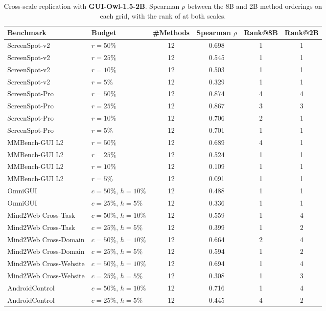 \begin{table}[t]
    \centering
    \caption{Cross-scale replication with \textbf{GUI-Owl-1.5-2B}. Spearman $\rho$ between the 8B and 2B method orderings on each grid, with the rank of \method{} at both scales.}
    \label{tab:scale-rep}
    \small
    \begin{tabular}{ll ccc c}
        \toprule
        \textbf{Benchmark} & \textbf{Budget} & \textbf{\#Methods} & \textbf{Spearman $\rho$} & \textbf{Rank@8B} & \textbf{Rank@2B} \\
        \midrule
        ScreenSpot-v2 & $r{=}50\%$ & 12 & 0.698 & 1 & 1 \\
        ScreenSpot-v2 & $r{=}25\%$ & 12 & 0.545 & 1 & 1 \\
        ScreenSpot-v2 & $r{=}10\%$ & 12 & 0.503 & 1 & 1 \\
        ScreenSpot-v2 & $r{=}5\%$ & 12 & 0.329 & 1 & 1 \\
        ScreenSpot-Pro & $r{=}50\%$ & 12 & 0.874 & 4 & 4 \\
        ScreenSpot-Pro & $r{=}25\%$ & 12 & 0.867 & 3 & 3 \\
        ScreenSpot-Pro & $r{=}10\%$ & 12 & 0.706 & 2 & 1 \\
        ScreenSpot-Pro & $r{=}5\%$ & 12 & 0.701 & 1 & 1 \\
        MMBench-GUI L2 & $r{=}50\%$ & 12 & 0.689 & 4 & 1 \\
        MMBench-GUI L2 & $r{=}25\%$ & 12 & 0.524 & 1 & 1 \\
        MMBench-GUI L2 & $r{=}10\%$ & 12 & 0.109 & 1 & 1 \\
        MMBench-GUI L2 & $r{=}5\%$ & 12 & 0.091 & 1 & 1 \\
        OmniGUI & $c{=}50\%$, $h{=}10\%$ & 12 & 0.488 & 1 & 1 \\
        OmniGUI & $c{=}25\%$, $h{=}5\%$ & 12 & 0.336 & 1 & 1 \\
        Mind2Web Cross-Task & $c{=}50\%$, $h{=}10\%$ & 12 & 0.559 & 1 & 4 \\
        Mind2Web Cross-Task & $c{=}25\%$, $h{=}5\%$ & 12 & 0.399 & 1 & 2 \\
        Mind2Web Cross-Domain & $c{=}50\%$, $h{=}10\%$ & 12 & 0.664 & 2 & 4 \\
        Mind2Web Cross-Domain & $c{=}25\%$, $h{=}5\%$ & 12 & 0.594 & 1 & 2 \\
        Mind2Web Cross-Website & $c{=}50\%$, $h{=}10\%$ & 12 & 0.694 & 1 & 4 \\
        Mind2Web Cross-Website & $c{=}25\%$, $h{=}5\%$ & 12 & 0.308 & 1 & 3 \\
        AndroidControl & $c{=}50\%$, $h{=}10\%$ & 12 & 0.716 & 1 & 4 \\
        AndroidControl & $c{=}25\%$, $h{=}5\%$ & 12 & 0.445 & 4 & 2 \\
        \bottomrule
    \end{tabular}
\end{table}
